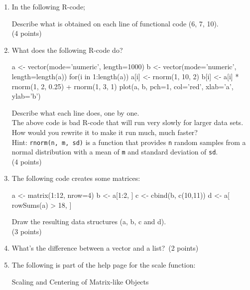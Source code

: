 \documentclass[11pt]{article}
\begin{document}
\begin{enumerate}
\item In the following R-code;

  Describe what is obtained on each line of functional code (6, 7, 10).\\
  (4 points)
\item What does the following R-code do?

  \begin{rcode}
  a <- vector(mode='numeric', length=1000)
  b <- vector(mode='numeric', length=length(a))
  for(i in 1:length(a)){
    a[i] <- rnorm(1, 10, 2)
    b[i] <- a[i] * rnorm(1, 2, 0.25) + rnorm(1, 3, 1)
  }
  plot(a, b, pch=1, col='red', xlab='a', ylab='b')    
  \end{rcode}
  Describe what each line does, one by one.\\
  The above code is bad R-code that will run very slowly for larger data
  sets. How would you rewrite it to make it run much, much faster?\\
  Hint: \texttt{rnorm(n, m, sd)} is a function that provides 
  \texttt{n} random samples from a normal distribution with a mean
  of \texttt{m} and standard deviation of \texttt{sd}.\\
  (4 points)
\item The following code creates some matrices:
 
  \begin{rcode}
  a <- matrix(1:12, nrow=4)
  b <- a[1:2, ]
  c <- cbind(b, c(10,11))
  d <- a[ rowSums(a) > 18, ]
  \end{rcode}
  Draw the resulting data structures (a, b, c and d).\\
  (3 points)
\item What's the difference between a vector and a list?\
  (2 points)

\item The following is part of the help page for the scale function:\\
  \begin{consolecode}
    Scaling and Centering of Matrix-like Objects


\end{consolecode}
\end{enumerate}
\end{document}
